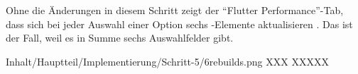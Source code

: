 Ohne die Änderungen in diesem Schritt zeigt der \enquote{Flutter Performance}-Tab, dass sich bei jeder Auswahl einer Option sechs -Elemente aktualisieren \Abb{\ref{fig:Schritt56rebuilds}}.
Das ist der Fall, weil es in Summe sechs Auswahlfelder gibt.

\begin{alexfigure}{Inhalt/Hauptteil/Implementierung/Schritt-5/6rebuilds.png}
  {XXX}
  {XXXXX}

  \label{fig:Schritt56rebuilds}

\end{alexfigure}




\ifincludeall \clearpage \fi
